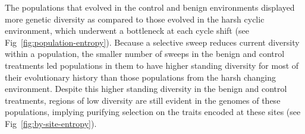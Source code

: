 \documentclass[10pt,letterpaper,final]{article}
\begin{document}
The populations that evolved in the control and benign environments displayed more genetic diversity as compared to those evolved in the harsh cyclic environment, which underwent a bottleneck at each cycle shift (see Fig~\ref{fig:population-entropy}). Because a selective sweep reduces current diversity within a population, the smaller number of sweeps
in the benign and control treatments led populations in them to have higher standing diversity for most of their evolutionary history than those populations from the harsh changing environment. Despite this higher standing diversity in the benign and control treatments, regions of low diversity are still evident in the genomes of these populations, implying purifying selection on the traits encoded at these sites (see Fig~\ref{fig:by-site-entropy}).
%
%
\end{document}
